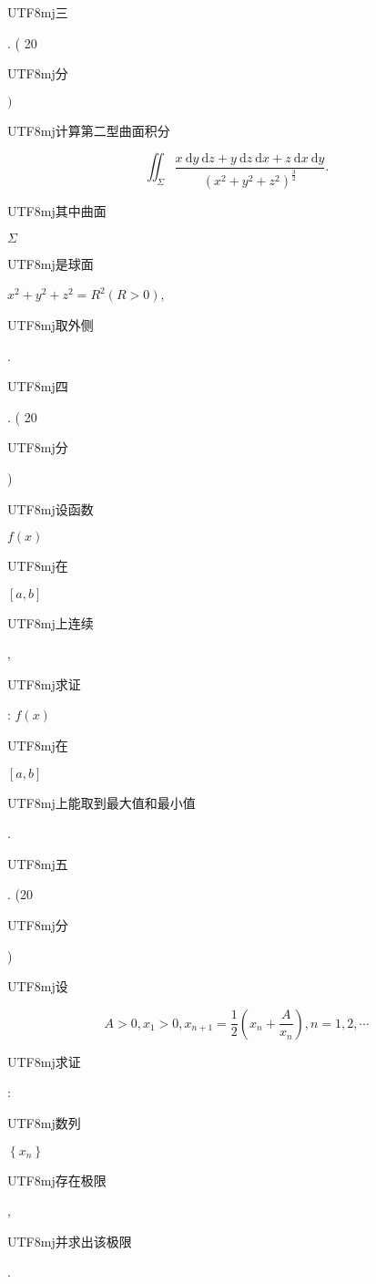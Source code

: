 \documentclass[10pt]{article}
\begin{document}
\begin{CJK}{UTF8}{mj}三\end{CJK}. ( 20 \begin{CJK}{UTF8}{mj}分\end{CJK} $)$ \begin{CJK}{UTF8}{mj}计算第二型曲面积分\end{CJK}
$$
\iint_{\Sigma} \frac{x \mathrm{~d} y \mathrm{~d} z+y \mathrm{~d} z \mathrm{~d} x+z \mathrm{~d} x \mathrm{~d} y}{\left(x^{2}+y^{2}+z^{2}\right)^{\frac{3}{2}}} .
$$
\begin{CJK}{UTF8}{mj}其中曲面\end{CJK} $\Sigma$ \begin{CJK}{UTF8}{mj}是球面\end{CJK} $x^{2}+y^{2}+z^{2}=R^{2}(R>0)$, \begin{CJK}{UTF8}{mj}取外侧\end{CJK}.

\begin{CJK}{UTF8}{mj}四\end{CJK}. ( 20 \begin{CJK}{UTF8}{mj}分\end{CJK}) \begin{CJK}{UTF8}{mj}设函数\end{CJK} $f(x)$ \begin{CJK}{UTF8}{mj}在\end{CJK} $[a, b]$ \begin{CJK}{UTF8}{mj}上连续\end{CJK}, \begin{CJK}{UTF8}{mj}求证\end{CJK}: $f(x)$ \begin{CJK}{UTF8}{mj}在\end{CJK} $[a, b]$ \begin{CJK}{UTF8}{mj}上能取到最大值和最小值\end{CJK}.

\begin{CJK}{UTF8}{mj}五\end{CJK}. (20 \begin{CJK}{UTF8}{mj}分\end{CJK}) \begin{CJK}{UTF8}{mj}设\end{CJK}
$$
A>0, x_{1}>0, x_{n+1}=\frac{1}{2}\left(x_{n}+\frac{A}{x_{n}}\right), n=1,2, \cdots
$$
\begin{CJK}{UTF8}{mj}求证\end{CJK}: \begin{CJK}{UTF8}{mj}数列\end{CJK} $\left\{x_{n}\right\}$ \begin{CJK}{UTF8}{mj}存在极限\end{CJK}, \begin{CJK}{UTF8}{mj}并求出该极限\end{CJK}.
\end{document}
